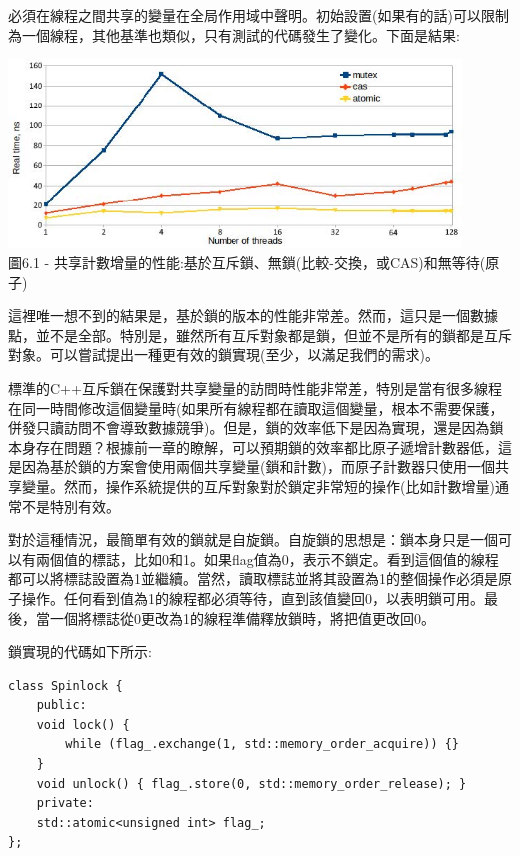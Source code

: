 必須在線程之間共享的變量在全局作用域中聲明。初始設置(如果有的話)可以限制為一個線程，其他基準也類似，只有測試的代碼發生了變化。下面是結果:

\begin{center}
\includegraphics[width=0.9\textwidth]{content/2/chapter6/images/1.jpg}\\
圖6.1 - 共享計數增量的性能:基於互斥鎖、無鎖(比較-交換，或CAS)和無等待(原子)
\end{center}

這裡唯一想不到的結果是，基於鎖的版本的性能非常差。然而，這只是一個數據點，並不是全部。特別是，雖然所有互斥對象都是鎖，但並不是所有的鎖都是互斥對象。可以嘗試提出一種更有效的鎖實現(至少，以滿足我們的需求)。


標準的C++互斥鎖在保護對共享變量的訪問時性能非常差，特別是當有很多線程在同一時間修改這個變量時(如果所有線程都在讀取這個變量，根本不需要保護，併發只讀訪問不會導致數據競爭)。但是，鎖的效率低下是因為實現，還是因為鎖本身存在問題？根據前一章的瞭解，可以預期鎖的效率都比原子遞增計數器低，這是因為基於鎖的方案會使用兩個共享變量(鎖和計數)，而原子計數器只使用一個共享變量。然而，操作系統提供的互斥對象對於鎖定非常短的操作(比如計數增量)通常不是特別有效。

對於這種情況，最簡單有效的鎖就是自旋鎖。自旋鎖的思想是：鎖本身只是一個可以有兩個值的標誌，比如0和1。如果flag值為0，表示不鎖定。看到這個值的線程都可以將標誌設置為1並繼續。當然，讀取標誌並將其設置為1的整個操作必須是原子操作。任何看到值為1的線程都必須等待，直到該值變回0，以表明鎖可用。最後，當一個將標誌從0更改為1的線程準備釋放鎖時，將把值更改回0。

鎖實現的代碼如下所示:

\begin{lstlisting}[style=styleCXX]
class Spinlock {
	public:
	void lock() {
		while (flag_.exchange(1, std::memory_order_acquire)) {}
	}
	void unlock() { flag_.store(0, std::memory_order_release); }
	private:
	std::atomic<unsigned int> flag_;
};
\end{lstlisting}

